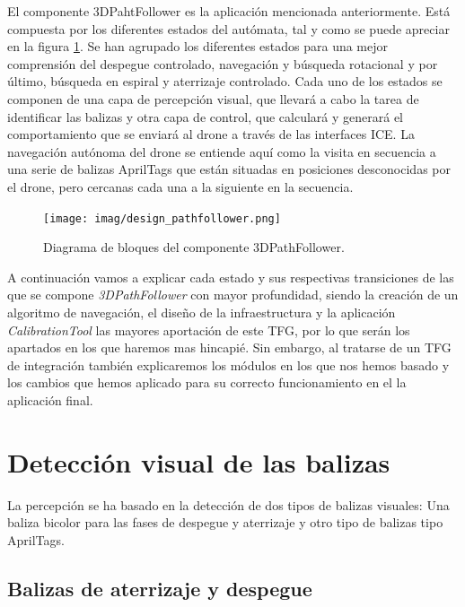 El componente 3DPahtFollower es la  aplicación mencionada anteriormente. Está compuesta por los diferentes estados del autómata, tal y como se puede apreciar en la figura \ref{fig:Solucion 3DPathFollower}. Se han agrupado los diferentes estados para una mejor comprensión del despegue controlado, navegación y búsqueda rotacional y por último, búsqueda en espiral y aterrizaje controlado. Cada uno de los estados se componen de una capa de percepción visual, que llevará a cabo la tarea de identificar las balizas y otra capa de control, que calculará y generará el comportamiento que se enviará al drone a través de las interfaces ICE. La navegación autónoma del drone se entiende aquí como la visita en secuencia a una serie de balizas AprilTags que están situadas en posiciones desconocidas por el drone, pero cercanas cada una a la siguiente en la secuencia.

\begin{figure}[H]
	\begin{center}	
		\texttt{[image: imag/design\_pathfollower.png]}
		\caption{Diagrama de bloques del componente 3DPathFollower.}
		\label{fig:Solucion 3DPathFollower}
	\end{center}
\end{figure}

A continuación vamos a explicar cada estado y sus respectivas transiciones de las que se compone \textit{3DPathFollower} con mayor profundidad, siendo la creación de un algoritmo de navegación, el diseño de la infraestructura y la aplicación \textit{CalibrationTool} las mayores aportación de este TFG, por lo que serán los apartados en los que haremos mas hincapié. Sin embargo, al tratarse de un TFG de integración también explicaremos los módulos en los que nos hemos basado y los cambios que hemos aplicado para su correcto funcionamiento en el la aplicación final.

\section{Detección visual de las balizas}

La percepción se ha basado en la detección de dos tipos de balizas visuales: Una baliza bicolor para las fases de despegue y aterrizaje y otro tipo de balizas tipo AprilTags. 

\subsection{Balizas de aterrizaje y despegue}

